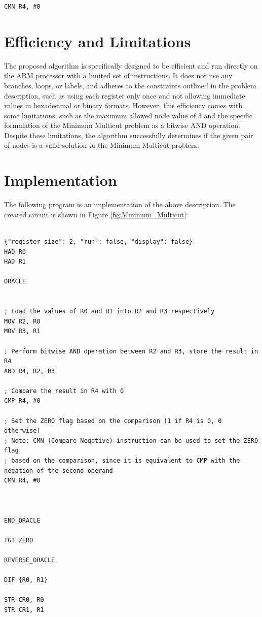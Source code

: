\begin{verbatim}
CMN R4, #0
\end{verbatim}

\section{Efficiency and Limitations}

The proposed algorithm is specifically designed to be efficient and run directly on the ARM processor with a limited set of instructions. It does not use any branches, loops, or labels, and adheres to the constraints outlined in the problem description, such as using each register only once and not allowing immediate values in hexadecimal or binary formats. However, this efficiency comes with some limitations, such as the maximum allowed node value of 3 and the specific formulation of the Minimum Multicut problem as a bitwise AND operation. Despite these limitations, the algorithm successfully determines if the given pair of nodes is a valid solution to the Minimum Multicut problem.



\section{Implementation}

The following program is an implementation of the above description. The created circuit is shown in Figure \ref{fig:Minimum_Multicut}:

\begin{lstlisting}

{"register_size": 2, "run": false, "display": false}
HAD R0
HAD R1

ORACLE


; Load the values of R0 and R1 into R2 and R3 respectively
MOV R2, R0
MOV R3, R1

; Perform bitwise AND operation between R2 and R3, store the result in R4
AND R4, R2, R3

; Compare the result in R4 with 0
CMP R4, #0

; Set the ZERO flag based on the comparison (1 if R4 is 0, 0 otherwise)
; Note: CMN (Compare Negative) instruction can be used to set the ZERO flag
; based on the comparison, since it is equivalent to CMP with the negation of the second operand
CMN R4, #0



END_ORACLE

TGT ZERO

REVERSE_ORACLE

DIF {R0, R1}

STR CR0, R0
STR CR1, R1


\end{lstlisting}

